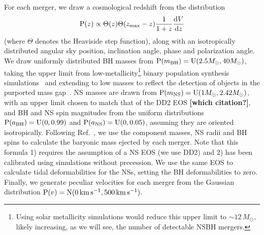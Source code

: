 \documentclass[%
 reprint,
 superscriptaddress,
 nofootinbib,
 amsmath,amssymb,
 aps,
]{revtex4-2}
\newcommand{\msun}{M_\odot}
\newcommand{\zmax}{\ensuremath{z_{\rm max}}}
\newcommand{\prob}{\ensuremath{{\rm P}}}
\newcommand{\normal}{{\rm{N}}}
\newcommand{\abh}{a_{\rm BH}}
\newcommand{\ans}{a_{\rm NS}}
\newcommand{\mbh}{m_{\rm BH}}
\newcommand{\mns}{m_{\rm NS}}
\newcommand{\uniform}{{\rm U}}
\newcommand{\step}{\Theta}
\newcommand{\kms}{\ensuremath{{\rm km\,s^{-1}}}}
\begin{document}
For each merger, we draw a cosmological redshift from the distribution
\begin{equation}
\prob(z) \propto \step(z) \step(\zmax-z) \frac{1}{1+z} \frac{{\rm d}V}{{\rm d}z}
\end{equation}
(where $\step$ denotes the Heaviside step function), along with an isotropically distributed angular sky position, inclination angle, phase and polarization angle. We draw uniformly distributed BH masses from $\prob(\mbh) = \uniform(2.5\msun, 40\msun)$, taking the upper limit from low-metallicity\footnote{Using solar metallicity simulations would reduce this upper limit to $\sim12\,\msun$, likely increasing, as we will see, the number of detectable NSBH mergers.}
binary population synthesis simulations~\cite{Kruckow_etal:2018} and extending to low masses to reflect the detection of objects in the purported mass gap~\cite{LVC:2020O3acat}. NS masses are drawn from $\prob(\mns) = \uniform(1\msun, 2.42\msun)$, with an upper limit chosen to match that of the DD2 EOS {\bf [which citation?]}, and BH and NS spin magnitudes from the uniform distributions $\prob(\abh) = \uniform(0, 0.99)$ and  $\prob(\ans) = \uniform(0, 0.05)$, assuming they are oriented isotropically. Following Ref.~\cite{Foucart_etal:2018}, we use the component masses, NS radii and BH spins to calculate the baryonic mass ejected by each merger. Note that this formula 1) requires the assumption of a NS EOS (we use DD2) and 2) has been calibrated using simulations without precession. We use the same EOS to calculate tidal deformabilities for the NSs, setting the BH deformabilities to zero. Finally, we generate peculiar velocities for each merger from the Gaussian distribution $\prob(v) = \normal(0\,\kms,500\,\kms)$.
\end{document}
